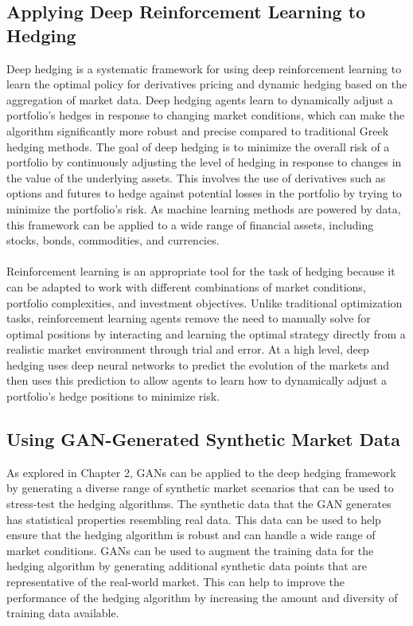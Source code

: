 \subsection{Applying Deep Reinforcement Learning to Hedging}

Deep hedging is a systematic framework for using deep reinforcement learning to learn the optimal policy for derivatives pricing and dynamic hedging based on the aggregation of market data. Deep hedging agents learn to dynamically adjust a portfolio's hedges in response to changing market conditions, which can make the algorithm significantly more robust and precise compared to traditional Greek hedging methods. The goal of deep hedging is to minimize the overall risk of a portfolio by continuously adjusting the level of hedging in response to changes in the value of the underlying assets. This involves the use of derivatives such as options and futures to hedge against potential losses in the portfolio by trying to minimize the portfolio's risk. As machine learning methods are powered by data, this framework can be applied to a wide range of financial assets, including stocks, bonds, commodities, and currencies.
\\
\\
Reinforcement learning is an appropriate tool for the task of hedging because it can be adapted to work with different combinations of market conditions, portfolio complexities, and investment objectives. Unlike traditional optimization tasks, reinforcement learning agents remove the need to manually solve for optimal positions by interacting and learning the optimal strategy directly from a realistic market environment through trial and error. At a high level, deep hedging uses deep neural networks to predict the evolution of the markets and then uses this prediction to allow agents to learn how to dynamically adjust a portfolio's hedge positions to minimize risk.

\subsection{Using GAN-Generated Synthetic Market Data}

As explored in Chapter 2, GANs can be applied to the deep hedging framework by generating a diverse range of synthetic market scenarios that can be used to stress-test the hedging algorithms. The synthetic data that the GAN generates has statistical properties resembling real data. This data can be used to help ensure that the hedging algorithm is robust and can handle a wide range of market conditions. GANs can be used to augment the training data for the hedging algorithm by generating additional synthetic data points that are representative of the real-world market. This can help to improve the performance of the hedging algorithm by increasing the amount and diversity of training data available.

